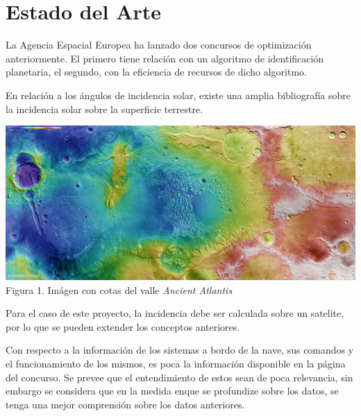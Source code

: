 \documentclass[../Main.tex]{subfiles}
\begin{document}
\section{Estado del Arte}
La Agencia Espacial Europea ha lanzado dos concursos de optimización anteriormente. El primero tiene relación con un algoritmo de identificación planetaria, el segundo, con la eficiencia de recursos de dicho algoritmo.
\newline \par
En relación a los ángulos de incidencia solar, existe una amplia bibliografía sobre la incidencia solar sobre la superficie terrestre.
\begin{center}
\includegraphics[width=\linewidth, trim={0 10cm 0 0}, clip]{Assets/Ancient_Atlantis.jpg}
\\Figura 1. Imágen con cotas del valle \textit{Ancient Atlantis}
\end{center}

\newline \par
Para el caso de este proyecto, la incidencia debe ser calculada sobre un satelite, por lo que se pueden extender los conceptos anteriores.
\newline \par
Con respecto a la información de los sistemas a bordo de la nave, sus comandos y el funcionamiento de los mismos, es poca la información disponible en la página del concurso. Se prevee que el entendimiento de estos sean de poca relevancia, sin embargo se considera que en la medida enque se profundize sobre los datos, se tenga una mejor comprensión sobre los datos anteriores. 
\end{document}
